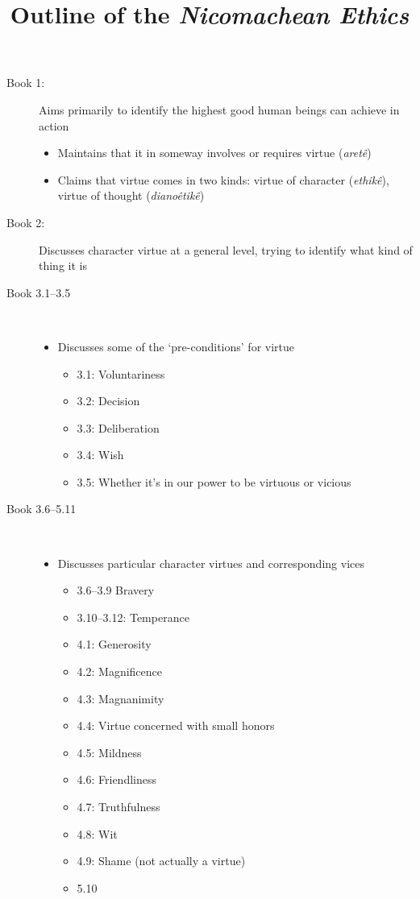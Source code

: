 \documentclass[11pt]{article}
\title{Outline of the \emph{Nicomachean Ethics}}
\author{}
\date{}
\begin{document}
\maketitle

\begin{description}
\item[Book 1:] Aims primarily to identify the highest good human beings can achieve in action

\begin{itemize}\item{Maintains that it in someway involves or requires virtue (\emph{aret\^{e}})}\item{Claims that virtue comes in two kinds: virtue of character (\emph{ethik\^{e}}), virtue of thought (\emph{diano\^{e}tik\^{e}})}\end{itemize}

\item[Book 2:] Discusses character virtue at a general level, trying to identify what kind of thing it is

\item[Book 3.1--3.5]\

\begin{itemize}\item{Discusses some of the `pre-conditions' for virtue}\begin{itemize}\item{3.1: Voluntariness}\item{3.2: Decision}\item{3.3: Deliberation}\item{3.4: Wish}\item{3.5: Whether it's in our power to be virtuous or vicious}\end{itemize}\end{itemize}

\item[Book 3.6--5.11]\

\begin{itemize}
\item{Discusses particular character virtues and corresponding vices}\begin{itemize}\item{3.6--3.9 Bravery}\item{3.10--3.12: Temperance}\item{4.1: Generosity}\item{4.2: Magnificence}\item{4.3: Magnanimity}\item{4.4: Virtue concerned with small honors}\item{4.5: Mildness}\item{4.6: Friendliness}\item{4.7: Truthfulness}\item{4.8: Wit}\item{4.9: Shame (not actually a virtue)}\item{5.10}
\end{itemize}
\end{itemize}
\end{description}
\end{document}
